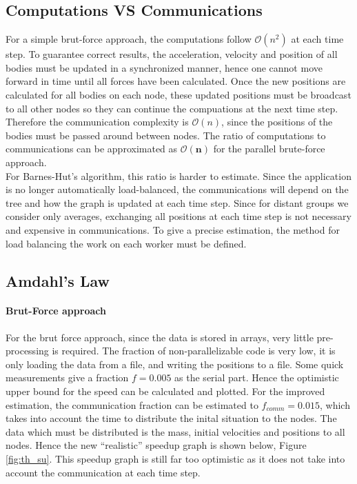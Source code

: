 \subsection{Computations VS Communications}
For a simple brut-force approach, the computations follow $\mathcal{O}(n^2)$ at each time step. To guarantee correct results, the acceleration, velocity and position of all bodies must be updated in a synchronized manner, hence one cannot move forward in time until all forces have been calculated. Once the new positions are calculated for all bodies on each node, these updated positions must be broadcast to all other nodes so they can continue the compuations at the next time step. Therefore the communication complexity is $\mathcal{O}(n)$, since the positions of the bodies must be passed around between nodes. The ratio of computations to communications can be approximated as $\boldsymbol{\mathcal{O}(n)}$ for the parallel brute-force approach.\\
For Barnes-Hut's algorithm, this ratio is harder to estimate. Since the application is no longer automatically load-balanced, the communications will depend on the tree and how the graph is updated at each time step. Since for distant groups we consider only averages, exchanging all positions at each time step is not necessary and expensive in communications. To give a precise estimation, the method for load balancing the work on each worker must be defined.
\subsection{Amdahl's Law}
\paragraph{Brut-Force approach}For the brut force approach, since the data is stored in arrays, very little pre-processing is required. The fraction of non-parallelizable code is very low, it is only loading the data from a file, and writing the positions to a file. Some quick measurements give a fraction $f=0.005$ as the serial part. Hence the optimistic upper bound for the speed can be calculated and plotted. For the improved estimation, the communication fraction can be estimated to $f_{comm} = 0.015$, which takes into account the time to distribute the inital situation to the nodes. The data which must be distributed is the mass, initial velocities and positions to all nodes. Hence the new ``realistic'' speedup graph is shown below, Figure \ref{fig:th_su}. This speedup graph is still far too optimistic as it does not take into account the communication at each time step.\\

